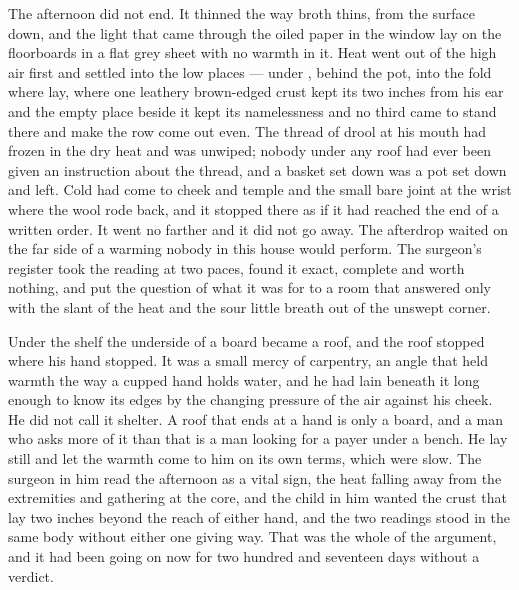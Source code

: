 The afternoon did not end. It thinned the way broth thins, from the surface down, and the light that came through the oiled paper in the window lay on the floorboards in a flat grey sheet with no warmth in it. Heat went out of the high air first and settled into the low places --- under , behind the pot, into the fold where  lay, where one leathery brown-edged crust kept its two inches from his ear and the empty place beside it kept its namelessness and no third came to stand there and make the row come out even. The thread of drool at his mouth had frozen in the dry heat and was unwiped; nobody under any roof had ever been given an instruction about the thread, and a basket set down was a pot set down and left. Cold had come to cheek and temple and the small bare joint at the wrist where the wool rode back, and it stopped there as if it had reached the end of a written order. It went no farther and it did not go away. The afterdrop waited on the far side of a warming nobody in this house would perform. The surgeon's register took the reading at two paces, found it exact, complete and worth nothing, and put the question of what it was for to a room that answered only with the slant of the heat and the sour little breath out of the unswept corner.

Under the shelf the underside of a board became a roof, and the roof stopped where his hand stopped. It was a small mercy of carpentry, an angle that held warmth the way a cupped hand holds water, and he had lain beneath it long enough to know its edges by the changing pressure of the air against his cheek. He did not call it shelter. A roof that ends at a hand is only a board, and a man who asks more of it than that is a man looking for a payer under a bench. He lay still and let the warmth come to him on its own terms, which were slow. The surgeon in him read the afternoon as a vital sign, the heat falling away from the extremities and gathering at the core, and the child in him wanted the crust that lay two inches beyond the reach of either hand, and the two readings stood in the same body without either one giving way. That was the whole of the argument, and it had been going on now for two hundred and seventeen days without a verdict.

\scenebreak

